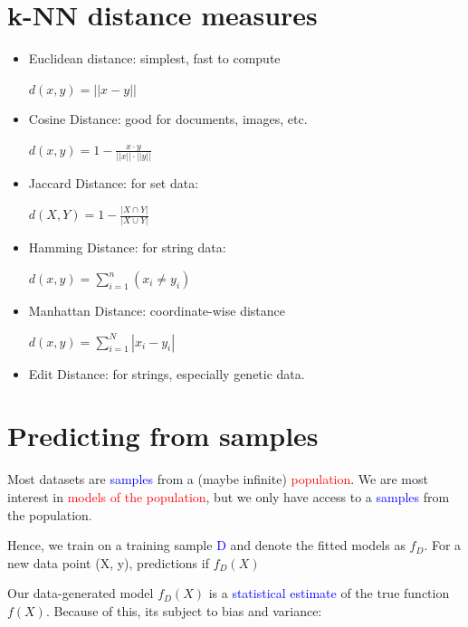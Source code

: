 \documentclass[11pt]{article}
\begin{document}
\section*{k-NN distance measures}

\begin{itemize}
	\item Euclidean distance: simplest, fast to compute
	\begin{center}
		$d(x, y) = ||x - y||$
	\end{center}
	\item Cosine Distance: good for documents, images, etc.
		\begin{center}
			$d(x, y) = 1 - \frac{x \cdot y}{||x|| \cdot ||y||}$
		\end{center}
	\item Jaccard Distance: for set data:
		\begin{center}
			$d(X, Y) = 1 - \frac{|X \cap Y|}{|X \cup Y|}$
		\end{center}
	\item Hamming Distance: for string data:
	\begin{center}
		$d(x, y) = \sum^{n}_{i = 1}{(x_i \neq y_i)}$
	\end{center}
	\item Manhattan Distance: coordinate-wise distance
	\begin{center}
		$d(x, y) = \sum^{N}_{i=1}{|x_i - y_i|} $
	\end{center}
	\item Edit Distance: for strings, especially genetic data.
\end{itemize}

\section*{Predicting from samples}

Most datasets are \textcolor{blue}{samples} from a (maybe infinite) \textcolor{red}{population}. We are most interest in \textcolor{red}{models of the population}, but we only have access to a \textcolor{blue}{samples}  from the population. 

Hence, we train on a training sample \textcolor{blue}{D} and denote the fitted models as $f_D$. For a new data point (X, y), predictions if $f_D(X)$

Our data-generated model $f_D(X)$ is a  \textcolor{blue}{statistical estimate} of the true function $f(X)$. Because of this, its subject to bias and variance:
\end{document}
